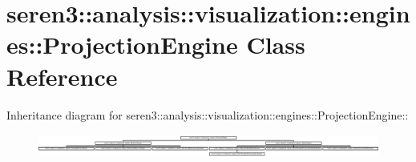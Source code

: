 \hypertarget{classseren3_1_1analysis_1_1visualization_1_1engines_1_1ProjectionEngine}{
\section{seren3::analysis::visualization::engines::ProjectionEngine Class Reference}
\label{classseren3_1_1analysis_1_1visualization_1_1engines_1_1ProjectionEngine}
}
Inheritance diagram for seren3::analysis::visualization::engines::ProjectionEngine::\begin{figure}[H]
\begin{center}
\leavevmode
\includegraphics[height=0.782669cm]{classseren3_1_1analysis_1_1visualization_1_1engines_1_1ProjectionEngine}
\end{center}
\end{figure}
